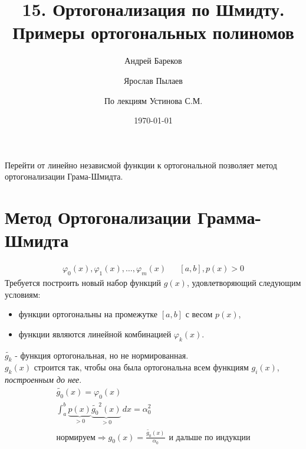 \documentclass[a4paper,11pt]{article}
\title{15. Ортогонализация по Шмидту. Примеры ортогональных полиномов}
\author{Андрей Бареков \and Ярослав Пылаев \and По лекциям Устинова С.М.}
\date{\today}
\begin{document}
\maketitle
\newpage

Перейти от линейно независмой функции к ортогональной позволяет метод ортогонализации Грама-Шмидта.
\section{Метод Ортогонализации Грамма-Шмидта}
\begin{align*}
  \varphi_0(x), \varphi_1(x), \dots, \varphi_m(x) && [a,b], p(x)>0
\end{align*}
Требуется построить новый набор функций $g(x)$, удовлетворяющий следующим условиям:
\begin{itemize}
  \item функции ортогональны на промежутке $[a,b]$ с весом $p(x)$,
  \item функции являются линейной комбинацией $\varphi_k(x)$.
\end{itemize}
\vspace{5mm}
$\widetilde{g_k}$ - функция ортогональная, но не нормированная. \\
$g_k(x)$ строится так, чтобы она была ортогональна всем функциям $g_i(x)$, \textit{построенным до нее}.
\begin{gather*}
  \widetilde{g_0}(x) = \varphi_0(x) \\
  \int_a^b \underbrace{p(x)}_{>0}\underbrace{\widetilde{g_0}^2(x)}_{>0}\,dx = \alpha_0^2 \\
  \textit{нормируем} \Rightarrow g_0(x) = \frac{\widetilde{g_0}(x)}{\alpha_0} \hspace{5pt}\text{и дальше по индукции}
\end{gather*}
\end{document}
